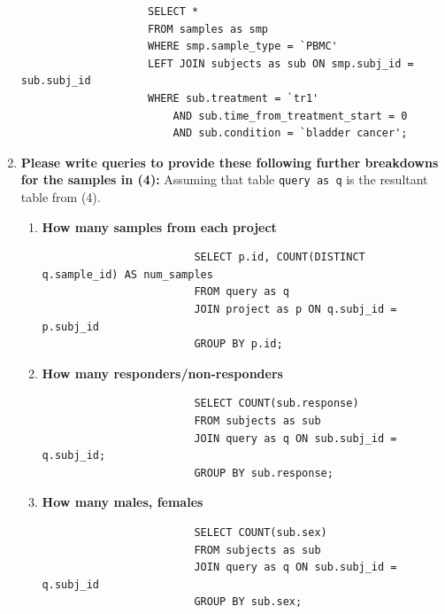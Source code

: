 \documentclass{article}
\begin{document}
\begin{enumerate}
                \begin{verbatim}
                    SELECT *
                    FROM samples as smp 
                    WHERE smp.sample_type = `PBMC'
                    LEFT JOIN subjects as sub ON smp.subj_id = sub.subj_id
                    WHERE sub.treatment = `tr1'
                        AND sub.time_from_treatment_start = 0
                        AND sub.condition = `bladder cancer';
                \end{verbatim}

        \item \textbf{Please write queries to provide these following further breakdowns for the samples in (4):}
              Assuming that table \texttt{query as q} is the resultant table from (4).
            \begin{enumerate}
                \item \textbf{How many samples from each project}
                      \begin{verbatim} 
                        SELECT p.id, COUNT(DISTINCT q.sample_id) AS num_samples
                        FROM query as q
                        JOIN project as p ON q.subj_id = p.subj_id
                        GROUP BY p.id;
                      \end{verbatim}

                \item \textbf{How many responders/non-responders}
                      \begin{verbatim}
                        SELECT COUNT(sub.response)
                        FROM subjects as sub
                        JOIN query as q ON sub.subj_id = q.subj_id;
                        GROUP BY sub.response;
                      \end{verbatim}

                \item \textbf{How many males, females}
                      \begin{verbatim}
                        SELECT COUNT(sub.sex)
                        FROM subjects as sub
                        JOIN query as q ON sub.subj_id = q.subj_id
                        GROUP BY sub.sex;
                      \end{verbatim}
            \end{enumerate}
    \end{enumerate}
\end{document}
